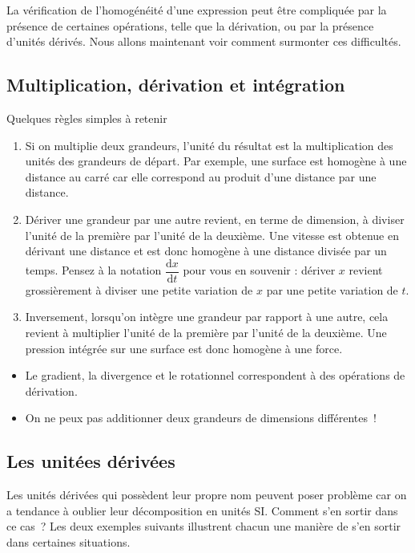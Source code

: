 \documentclass[12pt]{book}
\begin{document}
La vérification de l'homogénéité d'une expression peut être compliquée par la présence de certaines opérations,
telle que la dérivation, ou par la présence d'unités dérivés. Nous allons maintenant voir comment surmonter 
ces difficultés.
\subsection{Multiplication, dérivation et intégration}
Quelques règles simples à retenir

\begin{enumerate}
	\item Si on multiplie deux grandeurs, l'unité du résultat est 
	  la multiplication des unités des grandeurs de départ. Par exemple,
	  une surface est homogène à une distance au carré car elle correspond
	  au produit d'une distance par une distance.
	\item Dériver une grandeur par une autre revient, en terme de dimension,
	  à diviser l'unité de la première par l'unité de la deuxième. Une vitesse
	  est obtenue en dérivant une distance et est donc homogène à une distance
	  divisée par un temps. Pensez à la notation 
	  $\dfrac{\mathrm{d}x}{\mathrm{d}t}$ pour vous en souvenir : dériver
	  $x$ revient grossièrement à diviser une petite variation de $x$
	  par une petite variation de $t$.
	\item Inversement, lorsqu'on intègre une grandeur par rapport à une autre, cela
	  revient à multiplier l'unité de la première par l'unité de la deuxième.
	  Une pression intégrée sur une surface est donc homogène à une force.
\end{enumerate}

\begin{attention}
\begin{itemize}
	\item Le gradient, la divergence et le rotationnel correspondent à des 
	opérations de dérivation.
	\item On ne peux pas additionner deux grandeurs de dimensions 
	  différentes~!
\end{itemize}
\end{attention}
\subsection{Les unitées dérivées}
Les unités dérivées qui possèdent leur propre nom peuvent poser problème car 
on a tendance à oublier leur décomposition en unités SI.
Comment s'en sortir dans ce cas~? Les deux exemples
suivants illustrent chacun une manière de s’en sortir dans certaines
situations. 
\end{document}
